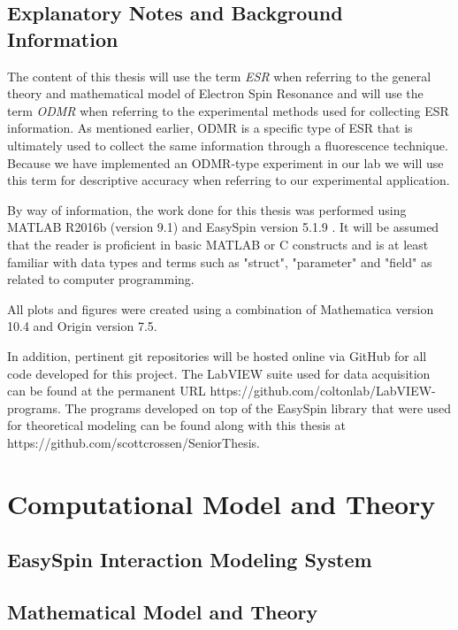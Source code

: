 \documentclass[oneside, astronomy, noacknowlegments]{BYUPhys}
\begin{document}
\section{Explanatory Notes and Background Information}

The content of this thesis will use the term \textit{ESR} when referring to the general theory and mathematical model of Electron Spin Resonance and will use the term \textit{ODMR} when referring to the experimental methods used for collecting ESR information. As mentioned earlier, ODMR is a specific type of ESR that is ultimately used to collect the same information through a fluorescence technique. Because we have implemented an ODMR-type experiment in our lab we will use this term for descriptive accuracy when referring to our experimental application.

By way of information, the work done for this thesis was performed using MATLAB R2016b (version 9.1) and EasySpin version 5.1.9 . It will be assumed that the reader is proficient in basic MATLAB or C constructs and is at least familiar with data types and terms such as "struct", "parameter" and "field" as related to computer programming.

All plots and figures were created using a combination of Mathematica version 10.4 and Origin version 7.5.

In addition, pertinent git repositories will be hosted online via GitHub for all code developed for this project. The LabVIEW suite used for data acquisition can be found at the permanent URL https://github.com/coltonlab/LabVIEW-programs. The programs developed on top of the EasySpin library that were used for theoretical modeling can be found along with this thesis at https://github.com/scottcrossen/SeniorThesis.










\chapter{Computational Model and Theory}

\section{EasySpin Interaction Modeling System}

\section{Mathematical Model and Theory}
\end{document}
